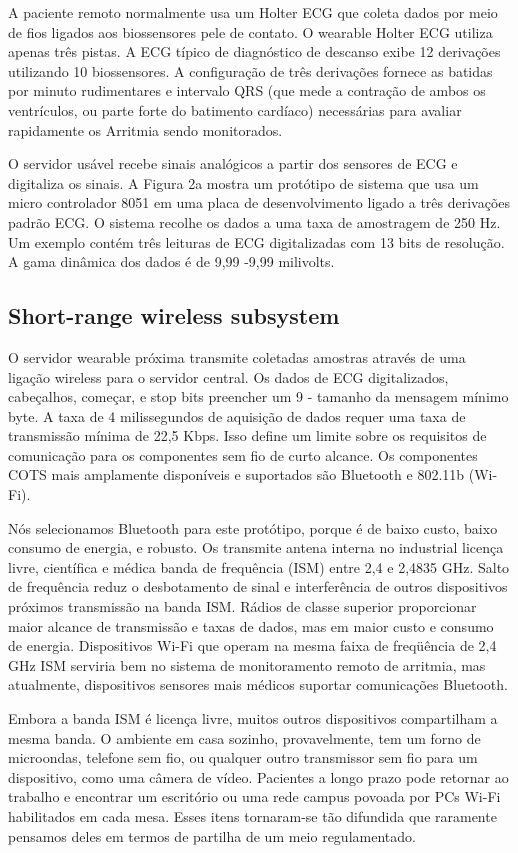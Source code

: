 \documentclass[a4paper,12pt]{article}
\begin{document}
A paciente remoto normalmente usa um Holter ECG que coleta dados por meio de fios ligados aos biossensores pele de contato. O wearable Holter ECG utiliza apenas três pistas. A ECG típico de diagnóstico de descanso exibe 12 derivações utilizando 10 biossensores. A configuração de três derivações fornece as batidas por minuto rudimentares e intervalo QRS (que mede a contração de ambos os ventrículos, ou parte forte do batimento cardíaco) necessárias para avaliar rapidamente os Arritmia sendo monitorados.

O servidor usável recebe sinais analógicos a partir dos sensores de ECG e digitaliza os sinais. A Figura 2a mostra um protótipo de sistema que usa um micro controlador 8051 em uma placa de desenvolvimento ligado a três derivações padrão ECG. O sistema recolhe os dados a uma taxa de amostragem de 250 Hz. Um exemplo contém três leituras de ECG digitalizadas com 13 bits de resolução. A gama dinâmica dos dados é de 9,99 -9,99 milivolts.

\subsection{Short-range wireless subsystem}

O servidor wearable próxima transmite coletadas amostras através de uma ligação wireless para o servidor central. Os dados de ECG digitalizados, cabeçalhos, começar, e stop bits preencher um 9 - tamanho da mensagem mínimo byte. A taxa de 4 milissegundos de aquisição de dados requer uma taxa de transmissão mínima de 22,5 Kbps. Isso define um limite sobre os requisitos de comunicação para os componentes sem fio de curto alcance. Os componentes COTS mais amplamente disponíveis e suportados são Bluetooth e 802.11b (Wi-Fi).

Nós selecionamos Bluetooth para este protótipo, porque é de baixo custo, baixo consumo de energia, e robusto. Os transmite antena interna no industrial licença livre, científica e médica banda de frequência (ISM) entre 2,4 e 2,4835 GHz. Salto de frequência reduz o desbotamento de sinal e interferência de outros dispositivos próximos transmissão na banda ISM. Rádios de classe superior proporcionar maior alcance de transmissão e taxas de dados, mas em maior custo e consumo de energia. Dispositivos Wi-Fi que operam na mesma faixa de freqüência de 2,4 GHz ISM serviria bem no sistema de monitoramento remoto de arritmia, mas atualmente, dispositivos sensores mais médicos suportar comunicações Bluetooth.

Embora a banda ISM é licença livre, muitos outros dispositivos compartilham a mesma banda. O ambiente em casa sozinho, provavelmente, tem um forno de microondas, telefone sem fio, ou qualquer outro transmissor sem fio para um dispositivo, como uma câmera de vídeo. Pacientes a longo prazo pode retornar ao trabalho e encontrar um escritório ou uma rede campus povoada por PCs Wi-Fi habilitados em cada mesa. Esses itens tornaram-se tão difundida que raramente pensamos deles em termos de partilha de um meio regulamentado.
\end{document}
